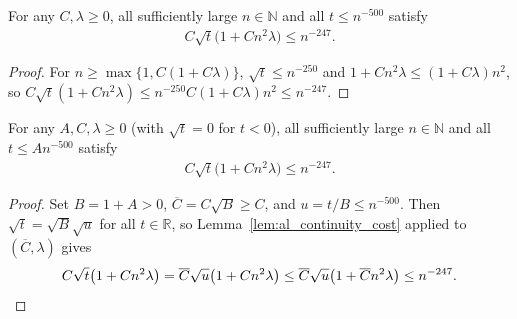 \begin{lemma}
    \label{lem:al_continuity_cost}
    \leanok
    For any $C,\lambda\ge0$, all sufficiently large $n\in\mathbb N$ and all
    $t\le n^{-500}$ satisfy \cite[Lemma~2.1; Proposition~9.2]{OpenAI2026AreaLaw}
    \begin{align}
        C\sqrt{t}\bigl(1+Cn^2\lambda\bigr)\le n^{-247}.
        \label{eq:al_continuity_cost}
    \end{align}
\end{lemma}
\begin{proof}\leanok
    For $n\ge\max\{1,C(1+C\lambda)\}$, $\sqrt t\le n^{-250}$ and
    $1+Cn^2\lambda\le(1+C\lambda)n^2$, so
    $C\sqrt t(1+Cn^2\lambda)\le n^{-250}C(1+C\lambda)n^2\le n^{-247}$.
\end{proof}

\begin{lemma}
    \label{lem:al_continuity_fixed_coefficient}
    \leanok
    For any $A,C,\lambda\ge0$ (with $\sqrt t=0$ for $t<0$), all sufficiently
    large $n\in\mathbb N$ and all $t\le An^{-500}$ satisfy
    \cite[Proposition~9.2]{OpenAI2026AreaLaw}
    \begin{align}
        C\sqrt{t}\bigl(1+Cn^2\lambda\bigr)\le n^{-247}.
        \label{eq:al_continuity_fixed_coefficient}
    \end{align}
\end{lemma}
\begin{proof}\leanok
    Set $B=1+A>0$, $\overline C=C\sqrt B\ge C$, and $u=t/B\le n^{-500}$. Then
    $\sqrt t=\sqrt B\sqrt u$ for all $t\in\mathbb R$, so
    Lemma~\ref{lem:al_continuity_cost} applied to $(\overline C,\lambda)$ gives
    \begin{align}
        C\sqrt t\bigl(1+Cn^2\lambda\bigr)
        =\overline C\sqrt u\bigl(1+Cn^2\lambda\bigr)
        \le\overline C\sqrt u\bigl(1+\overline Cn^2\lambda\bigr)
        \le n^{-247}.
        \notag
    \end{align}
\end{proof}

